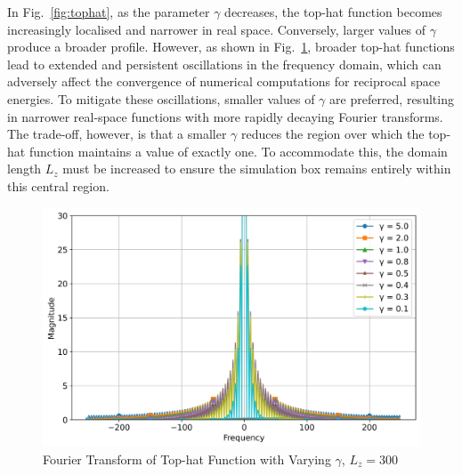 In Fig.~\ref{fig:tophat}, as the parameter $\gamma$ decreases, the top-hat function becomes increasingly localised and narrower in real space. Conversely, larger values of $\gamma$ produce a broader profile. However, as shown in Fig.~\ref{fig:fourieroftophatvarygammaL300}, broader top-hat functions lead to extended and persistent oscillations in the frequency domain, which can adversely affect the convergence of numerical computations for reciprocal space energies. To mitigate these oscillations, smaller values of $\gamma$ are preferred, resulting in narrower real-space functions with more rapidly decaying Fourier transforms. The trade-off, however, is that a smaller $\gamma$ reduces the region over which the top-hat function maintains a value of exactly one. To accommodate this, the domain length $L_z$ must be increased to ensure the simulation box remains entirely within this central region.

\begin{figure}[htbp]
  \centering
  \includegraphics[width=\linewidth]{images/fourieroftophatvarygammaL300.jpg}
  \caption{Fourier Transform of Top-hat Function with Varying $\gamma$, $L_z = 300$}
  \label{fig:fourieroftophatvarygammaL300}
\end{figure}
  

